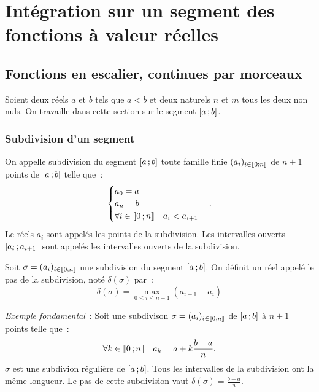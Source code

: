 \chapter{Intégration sur un segment des fonctions à valeur réelles}\label{chap:integration}
\minitoc%
\minilof%
\minilot%
%
\section{Fonctions en escalier, continues par morceaux}

Soient deux réels \(a\) et \(b\) tels que \(a<b\) et deux naturels \(n\) et
\(m\) tous les deux non nuls. On travaille dans cette section sur le segment
\(\left[ a \, ; {} b \right]\).

\subsection{Subdivision d'un segment}

\begin{defdef}
  On appelle subdivision du segment \(\left[ a \, ; {} b \right]\) toute famille finie
  \((a_i)_{i \in \mathopen{\llbracket}0\mathclose{}\mathpunct{};n\mathclose{\rrbracket}}\) de \(n+1\) points de
  \(\left[ a \, ; {} b \right]\) telle que~:
  \begin{equation}
    \begin{cases}
      a_0=a \\
      a_n=b \\
      \forall i \in \mathopen{\llbracket}0\mathclose{}\mathpunct{};n\mathclose{\rrbracket} \quad a_i<a_{i+1}
    \end{cases}.
  \end{equation}
  Le réels \(a_i\) sont appelés les points de la subdivision. Les intervalles
  ouverts \(\left] a_i \, ; {} a_{i+1} \right[\) sont appelés les intervalles ouverts
  de la subdivision.
\end{defdef}

\begin{defdef}
  Soit \(\sigma=(a_i)_{i \in \mathopen{\llbracket}0\mathclose{}\mathpunct{};n\mathclose{\rrbracket}}\) une subdivision du
  segment \(\left[ a \, ; {} b \right]\). On définit un réel appelé le pas de la
  subdivision, noté \(\delta(\sigma)\) par~:
  \begin{equation}
    \delta(\sigma)=\max_{0 \leqslant i \leqslant n-1}(a_{i+1}-a_i)
  \end{equation}
\end{defdef}

\emph{Exemple fondamental}~: Soit une subdivison \(\sigma=(a_i)_{i \in
\mathopen{\llbracket}0\mathclose{}\mathpunct{};n\mathclose{\rrbracket}}\) de \(\left[ a \, ; {} b \right]\) à \(n+1\) points telle
que~:
\begin{equation}
  \forall k \in \mathopen{\llbracket}0\mathclose{}\mathpunct{};n\mathclose{\rrbracket} \quad a_k=a+k \frac{b-a}{n}.
\end{equation}
\(\sigma\) est une subdivion régulière de \(\left[ a \, ; {} b \right]\). Tous les
intervalles de la subdivision ont la même longueur. Le pas de cette subdivision
vaut \(\delta(\sigma)=\frac{b-a}{n}\).

